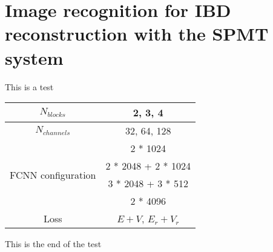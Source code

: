 \chapter{Image recognition for IBD reconstruction with the SPMT system}
\label{sec:jcnn}
This is a test
\begin{table}[ht]
  \centering
  \begin{tabular}{ | c | c | }
    \hline $N_{blocks}$ & {2, 3, 4} \\
    \hline $N_{channels}$ & {32, 64, 128} \\
    \hline
    \multirow{4}{*}{FCNN configuration} & 2 * 1024 \\
                                        & 2 * 2048 + 2 * 1024 \\
                                        & 3 * 2048 + 3 * 512 \\
                                        & 2 * 4096 \\
    \hline
    Loss & $E+V$, $E_r + V_r$ \\
    \hline

  \end{tabular}
\end{table}
This is the end of the test
